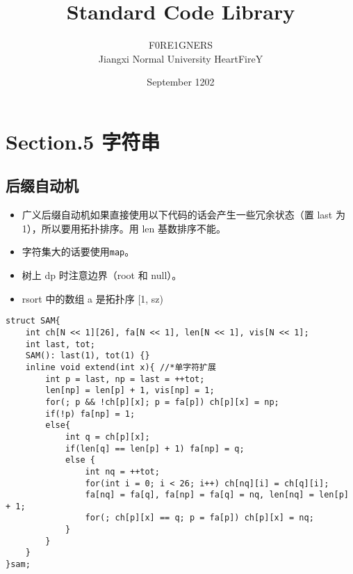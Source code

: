 \documentclass[]{article}
\date{}
\title{\vspace{50mm} \huge Standard Code Library \\[20pt]}
\author{F0RE1GNERS \\[10pt] Jiangxi Normal University HeartFireY}
\date{September 1202}
\providecommand{\tightlist}{%
  \setlength{\itemsep}{0pt}\setlength{\parskip}{0pt}}
\begin{document}
\begin{titlepage}

\maketitle

\end{titlepage}

\newpage

\renewcommand\labelitemi{$\bullet$}

{
\setcounter{tocdepth}{3}
\tableofcontents
\newpage
}








\hypertarget{section.5-ux5b57ux7b26ux4e32}{%
\section{Section.5 字符串}\label{section.5-ux5b57ux7b26ux4e32}}

\hypertarget{ux540eux7f00ux81eaux52a8ux673a}{%
\subsection{后缀自动机}\label{ux540eux7f00ux81eaux52a8ux673a}}

\begin{itemize}
\tightlist
\item
  广义后缀自动机如果直接使用以下代码的话会产生一些冗余状态（置 last 为
  1），所以要用拓扑排序。用 len 基数排序不能。
\item
  字符集大的话要使用\texttt{map}。
\item
  树上 dp 时注意边界（root 和 null）。
\item
  rsort 中的数组 a 是拓扑序 {[}1, sz)
\end{itemize}

\begin{verbatim}
struct SAM{
    int ch[N << 1][26], fa[N << 1], len[N << 1], vis[N << 1];
    int last, tot;
    SAM(): last(1), tot(1) {}
    inline void extend(int x){ //*单字符扩展
        int p = last, np = last = ++tot;
        len[np] = len[p] + 1, vis[np] = 1;
        for(; p && !ch[p][x]; p = fa[p]) ch[p][x] = np;
        if(!p) fa[np] = 1;
        else{
            int q = ch[p][x];
            if(len[q] == len[p] + 1) fa[np] = q;
            else {
                int nq = ++tot;
                for(int i = 0; i < 26; i++) ch[nq][i] = ch[q][i];
                fa[nq] = fa[q], fa[np] = fa[q] = nq, len[nq] = len[p] + 1;
                for(; ch[p][x] == q; p = fa[p]) ch[p][x] = nq;
            }
        }
    }
}sam;
\end{verbatim}
\end{document}
